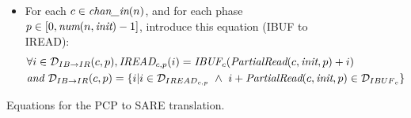 \begin{figure}[t]
{\begin{minipage}{6.3in}
\begin{itemize}
introduce this equation (SWRITE to SBUF):
\begin{align}
&\forall (i,j) \in {\cal D}_{SW {\small \rightarrow} SB}(c,p,q),
\mt{SBUF}_{c}(i,j) = \nonumber\\
&~~~~~~\mt{SWRITE}_{c, p}(i, q,
                     j - \mt{Offset}_{SW {\small \rightarrow} SB}(q,n,c,p)),
\mt{where } \\&{\cal D}_{SW {\small \rightarrow} SB}(c,p,q) = 
  {\cal D}_{{SBUF}_{c}} \cap 
  \{ (i,j) | \mt{Offset}_{SW {\small \rightarrow} SB}(q,n,c,p) \le j
             \le \mt{Offset}_{SW {\small \rightarrow} SB}(q,n,c,p+1) - 1 \} \nonumber\\\nonumber
&\mt{and } \mt{Offset}_{SW {\small \rightarrow} SB}(q,n,c,p') = q*\mt{TotalWrite}(n,c,\mt{steady}) + \mt{PartialWrite}(c,\mt{steady},p'))
\end{align}
%
\item For each $c \in \mbox{\it chan\_in}(n)$, and for each phase $p \in
[0, \mbox{\it num}(n, \mbox{\it init})-1]$, introduce this equation (IBUF to IREAD):
\begin{align}
&\forall i \in {\cal D}_{IB {\small \rightarrow} IR}(c,p), 
\mbox{\it IREAD}_{c, p}(i) = \mbox{\it IBUF}_{c}(\mbox{\it PartialRead}(c, \mbox{\it init}, p) + i) \\ \nonumber
&\mbox{\it and }{\cal D}_{IB {\small \rightarrow} IR}(c,p) = 
  \{ i | i \in {\cal D}_{{IREAD}_{c,p}} ~\wedge~ 
         i + \mbox{\it PartialRead}(c, \mbox{\it init}, p) \in {\cal D}_{{IBUF}_{c}} \}
\end{align}
%
\end{itemize}
\end{minipage}}
\caption{Equations for the PCP to SARE translation.
\protect\label{fig:pcptosare2}}
\end{figure}

